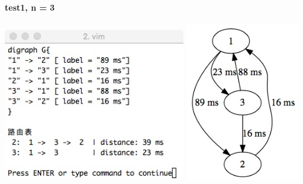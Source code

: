 \documentclass{article}
\begin{document}
		\paragraph{test1, n = 3}
			\begin{center}
			\includegraphics[width = 8cm]{data3.jpeg}
			\includegraphics[width = 5cm]{data3viz.jpeg}
			\end{center}
\end{document}
